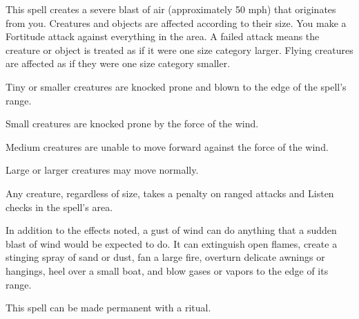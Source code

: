\begin{spelleffect}
  This spell creates a severe blast of air (approximately 50 mph) that originates from you. Creatures and objects are affected according to their size. You make a Fortitude attack against everything in the area. A failed attack means the creature or object is treated as if it were one size category larger. Flying creatures are affected as if they were one size category smaller.
  \begin{itemize*}
    \item Tiny or smaller creatures are knocked prone and blown to the edge of the spell's range.
    \item Small creatures are knocked prone by the force of the wind.
    \item Medium creatures are unable to move forward against the force of the wind.
    \item Large or larger creatures may move normally.
  \end{itemize*}
  \par Any creature, regardless of size, takes a  penalty on ranged attacks and Listen checks in the spell's area.
  \par In addition to the effects noted, a gust of wind can do anything that a sudden blast of wind would be expected to do. It can extinguish open flames, create a stinging spray of sand or dust, fan a large fire, overturn delicate awnings or hangings, heel over a small boat, and blow gases or vapors to the edge of its range.
\end{spelleffect}
\begin{spellnotes}
This spell can be made permanent with a  ritual.
\end{spellnotes}

\begin{comment}
\subsubsection{H}
\end{comment}

